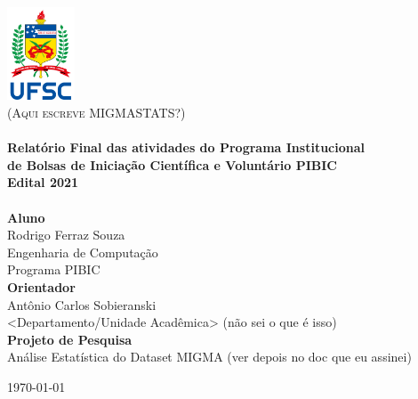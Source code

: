 \begin{titlepage}
    \begin{center}

        \includegraphics[width=0.15\textwidth]{images/ufsc_logo_sf.png}~
        \\[2cm]

        \textsc{(Aqui escreve MIGMASTATS?)}
        \\[2cm]

        \HRule \\[0.4cm]
        {\large \bfseries Relatório Final das atividades do Programa Institucional \\
        de Bolsas de Iniciação Científica e Voluntário PIBIC \\
        Edital 2021\\[0.4cm]}
        \HRule
        \\[2cm]

        \large\textbf{Aluno}\\
        Rodrigo Ferraz Souza\\
        Engenharia de Computação \\
        Programa PIBIC
        \\[1cm]

        \large\textbf{Orientador}\\
        Antônio Carlos Sobieranski\\
        <Departamento/Unidade Acadêmica> (não sei o que é isso)
        \\[1cm]

        \large\textbf{Projeto de Pesquisa}\\
        Análise Estatística do Dataset MIGMA (ver depois no doc que eu assinei)\\[1cm]


        \vfill

        {\large \today}

    \end{center}
\end{titlepage}